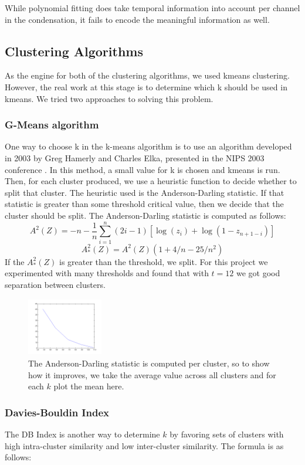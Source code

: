 \documentclass[conference]{IEEEtran}
\begin{document}
While polynomial fitting does take temporal information into
account per channel in the condensation, it fails to encode the
meaningful information as well.

\subsection{Clustering Algorithms}
As the engine for both of the clustering algorithms, we used kmeans
clustering. However, the real work at this stage is to determine which k
should be used in kmeans. We tried two approaches to solving this
problem. 

\subsubsection{G-Means algorithm}
One way to choose k in the k-means algorithm is to use an algorithm
developed in 2003 by Greg Hamerly and Charles Elka, presented in the NIPS
2003 conference \cite{gmeans}. In this method, a small value for k is
chosen and kmeans is run. Then, for each cluster produced, we use a
heuristic function to decide whether to split that cluster. The heuristic
used is the Anderson-Darling statistic. If that statistic is greater than
some threshold critical value, then we decide that the cluster should be
split. The Anderson-Darling statistic is computed as follows:
$$
A^2(Z) = -n - \frac{1}{n}\sum_{i=1}^n (2i -
1)[\log(z_i)+\log(1-z_{n+1-i})]
$$$$
A^2_*(Z) = A^2(Z)(1 + 4/n - 25/n^2)
$$
If the $A^2_*(Z)$ is greater than the threshold, we split. For this
project we experimented with many thresholds and found that with $t=12$ we
got good separation between clusters.

\begin{figure}
\centering
\includegraphics[width=1.3in,height=1in]{../poster/images/gmeans_k_vs_metric.png} 
\caption{The Anderson-Darling statistic is computed per cluster, so to
  show how it improves, we take the average value across all clusters and
  for each $k$ plot the mean here.}
\end{figure}


\subsubsection{Davies-Bouldin Index}
The DB Index is
another way to determine $k$ by favoring sets of clusters
with high intra-cluster similarity and low inter-cluster
similarity.  The formula is as follows:
\end{document}
